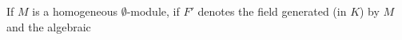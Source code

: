 If $M$ is a homogeneous $\emptyset$-module, if $F'$ denotes the field generated (in $K$) by $M$ and the algebraic